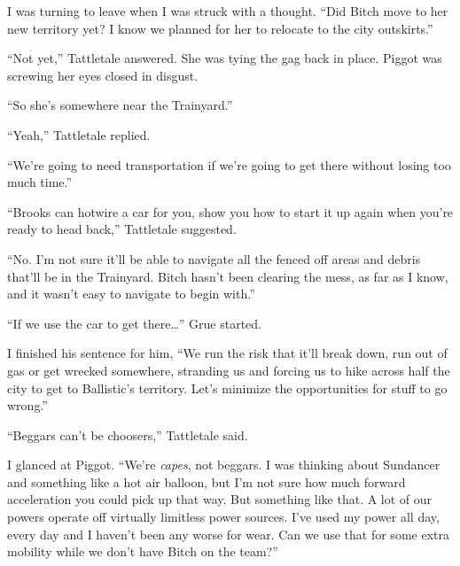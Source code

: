 





I was turning to leave when I was struck with a thought.  ``Did Bitch move to her new territory yet?  I know we planned for her to relocate to the city outskirts.''



``Not yet,'' Tattletale answered.  She was tying the gag back in place.  Piggot was screwing her eyes closed in disgust.



``So she's somewhere near the Trainyard.''



``Yeah,'' Tattletale replied.



``We're going to need transportation if we're going to get there without losing too much time.''



``Brooks can hotwire a car for you, show you how to start it up again when you're ready to head back,'' Tattletale suggested.



``No.  I'm not sure it'll be able to navigate all the fenced off areas and debris that'll be in the Trainyard.  Bitch hasn't been clearing the mess, as far as I know, and it wasn't easy to navigate to begin with.''



``If we use the car to get there\ldots'' Grue started.



I finished his sentence for him, ``We run the risk that it'll break down, run out of gas or get wrecked somewhere, stranding us and forcing us to hike across half the city to get to Ballistic's territory.  Let's minimize the opportunities for stuff to go wrong.''



``Beggars can't be choosers,'' Tattletale said.



I glanced at Piggot.  ``We're \emph{capes}, not beggars.  I was thinking about Sundancer and something like a hot air balloon, but I'm not sure how much forward acceleration you could pick up that way.  But something like that.  A lot of our powers operate off virtually limitless power sources.  I've used my power all day, every day and I haven't been any worse for wear.  Can we use that for some extra mobility while we don't have Bitch on the team?''



